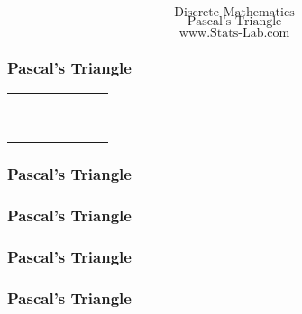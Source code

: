 \documentclass{beamer}
\begin{document}
\begin{frame}


{
\huge
\[ \mbox{Discrete Mathematics} \]
\[ \mbox{Pascal's Triangle} \]
}
{
\Large
\[ \mbox{www.Stats-Lab.com} \]
}
\end{frame}
\begin{frame}
\frametitle{Pascal's Triangle}
\begin{center}
\Large
\begin{tabular}{ccccccc}
\hline \phantom{space}  & \phantom{space} & \phantom{space} & \phantom{space} & \phantom{space}  & \phantom{space} & \phantom{space} \\ 
\hline  &  &  &  &  &  &  \\ 
\hline  &  &  &  &  &  &  \\ 
\hline  &  &  &  &  &  &  \\ 
\hline  &  &  &  &  &  &  \\ 
\hline  &  &  &  &  &  &  \\ 
\hline  &  &  &  &  &  &  \\ 
\hline  &  &  &  &  &  &  \\ 
\hline  &  &  &  &  &  &  \\ 
\hline  &  &  &  &  &  &  \\ 
\hline 
\end{tabular} 
\end{center}
\phantom{space}
\end{frame}
\begin{frame}
\frametitle{Pascal's Triangle}

\end{frame}
\begin{frame}
\frametitle{Pascal's Triangle}

\end{frame}
\begin{frame}
\frametitle{Pascal's Triangle}

\end{frame}
\begin{frame}
\frametitle{Pascal's Triangle}

\end{frame}
\end{document}
